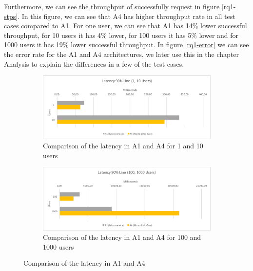\documentclass[a4paper,oneside]{bth}
\begin{document}
\par\vspace{0.5cm}
Furthermore, we can see the throughput of successfully request in figure \ref{rq1-stps}. In this figure, we can see that A4 has higher throughput rate in all test cases compared to A1. For one user, we can see that A1 has 14\% lower successful throughput, for 10 users it has 4\% lower, for 100 users it has 5\% lower and for 1000 users it has 19\% lower successful throughput.
In figure \ref{rq1-error} we can see the error rate for the A1 and A4 architectures, we later use this in the chapter Analysis to explain the differences in a few of the test cases.

\begin{figure}[h]
\begin{center}

\begin{subfigure}[b]{1\textwidth}
\includegraphics[width=13cm]{Graph/rq1-latency-1}
\caption{Comparison of the latency in A1 and A4 for 1 and 10 users}
\end{subfigure}

\begin{subfigure}[b]{1\textwidth}
\includegraphics[width=13cm]{Graph/rq1-latency-2}
\caption{Comparison of the latency in A1 and A4 for 100 and 1000 users}
\end{subfigure}

\caption{Comparison of the latency in A1 and A4}
\label{rq1-latency}

\end{center}
\end{figure}
\end{document}
